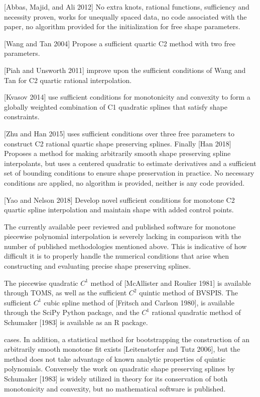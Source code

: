 [Abbas, Majid, and Ali 2012] No extra knots, rational functions, sufficiency and necessity proven, works for unequally spaced data, no code associated with the paper, no algorithm provided for the initialization for free shape parameters.

[Wang and Tan 2004] Propose a sufficient quartic C2 method with two free parameters.

[Piah and Unsworth 2011] improve upon the sufficient conditions of Wang and Tan for C2 quartic rational interpolation.

[Kvasov 2014] use sufficient conditions for monotonicity and convexity to form a globally weighted combination of C1 quadratic splines that satisfy shape constraints.

[Zhu and Han 2015] uses sufficient conditions over three free parameters to construct C2 rational quartic shape preserving splines. Finally [Han 2018] Proposes a method for making arbitrarily smooth shape preserving spline interpolants, but uses a centered quadratic to estimate derivatives and a sufficient set of bounding conditions to ensure shape preservation in practice. No necessary conditions are applied, no algorithm is provided, neither is any code provided.

[Yao and Nelson 2018] Develop novel sufficient conditions for monotone C2 quartic spline interpolation and maintain shape with added control points.


The currently available peer reviewed and published software for
monotone piecewise polynomial interpolation is severely lacking in
comparison with the number of published methodologies mentioned
above. This is indicative of how difficult it is to properly handle
the numerical conditions that arise when constructing and evaluating
precise shape preserving splines.

The piecewise quadratic $C^1$ method of [McAllister and Roulier 1981]
is available through TOMS, as well as the sufficient $C^2$ quintic
method of BVSPIS. The sufficient $C^1$ cubic spline method of [Fritsch and Carlson 1980],
is available through the SciPy Python package, and the $C^1$ rational
quadratic method of Schumaker [1983] is available as an R package.

cases. In addition, a statistical method for bootstrapping the
construction of an arbitrarily smooth monotone fit exists
[Leitenstorfer and Tutz 2006], but the method does not take advantage
of known analytic properties of quintic polynomials.  Conversely the
work on quadratic shape preserving splines by Schumaker [1983] is
widely utilized in theory for its conservation of both monotonicity
and convexity, but no mathematical software is published.

